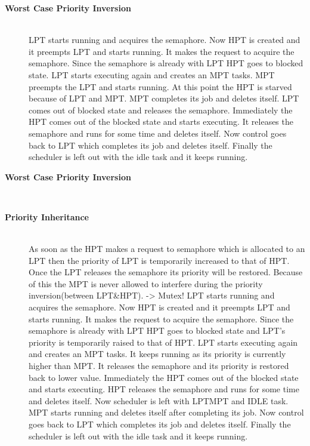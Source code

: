\begin{description}
\item[{\rot\bf Worst Case Priority Inversion}]~\\[-3ex]
\bi
\ite LPT starts running and acquires the semaphore.
\ite Now HPT is created and it preempts LPT and starts running. It makes the request to acquire the semaphore. Since the semaphore is already with LPT HPT goes to blocked state.
\ite LPT starts executing again and creates an MPT tasks.
\ite MPT preempts the LPT and starts running. At this point the HPT is starved because of LPT and MPT. MPT completes its job and deletes itself.
\ite LPT comes out of blocked state and releases the semaphore.
\ite Immediately the HPT comes out of the blocked state and starts executing. It releases the semaphore and runs for some time and deletes itself.
\ite Now control goes back to LPT which completes its job and deletes itself.
\ite Finally the scheduler is left out with the idle task and it keeps running.
\ei

\os{\newpage}



\item[{\rot\bf Worst Case Priority Inversion}]~\\[-3ex]

\os{\newpage}



\item[{\rot\bf Priority Inheritance}]~\\[-3ex]
\bi
\ite As soon as the HPT makes a request to semaphore which is allocated to an LPT then the priority of LPT is temporarily increased to that of HPT. Once the LPT releases the semaphore its priority will be restored. Because of this the MPT is never allowed to interfere during the priority inversion(between LPT\&HPT). -> Mutex!
\ite
\ite LPT starts running and acquires the semaphore.
\ite Now HPT is created and it preempts LPT and starts running. It makes the request to acquire the semaphore. Since the semaphore is already with LPT HPT goes to blocked state and LPT's priority is temporarily raised to that of HPT.
\ite LPT starts executing again and creates an MPT tasks. It keeps running as its priority is currently higher than MPT. It releases the semaphore and its priority is restored back to lower value.
\ite Immediately the HPT comes out of the blocked state and starts executing.
\ite HPT releases the semaphore and runs for some time and deletes itself.
\ite Now scheduler is left with LPTMPT and IDLE task. MPT starts running and deletes itself after completing its job.
\ite Now control goes back to LPT which completes its job and deletes itself.
\ite Finally the scheduler is left out with the idle task and it keeps running.
\ei


\end{description}
